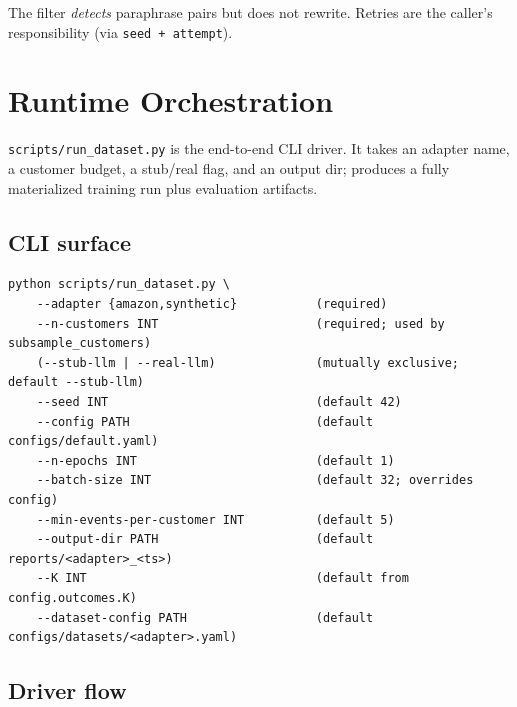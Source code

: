 \documentclass[11pt,a4paper]{article}
\begin{document}
The filter \emph{detects} paraphrase pairs but does not rewrite.
Retries are the caller's responsibility (via \texttt{seed + attempt}).

\section{Runtime Orchestration}
\label{sec:driver}

\texttt{scripts/run\_dataset.py} is the end-to-end CLI driver. It
takes an adapter name, a customer budget, a stub/real flag, and an
output dir; produces a fully materialized training run plus evaluation
artifacts.

\subsection{CLI surface}

\begin{lstlisting}[basicstyle=\ttfamily\footnotesize]
python scripts/run_dataset.py \
    --adapter {amazon,synthetic}           (required)
    --n-customers INT                      (required; used by subsample_customers)
    (--stub-llm | --real-llm)              (mutually exclusive; default --stub-llm)
    --seed INT                             (default 42)
    --config PATH                          (default configs/default.yaml)
    --n-epochs INT                         (default 1)
    --batch-size INT                       (default 32; overrides config)
    --min-events-per-customer INT          (default 5)
    --output-dir PATH                      (default reports/<adapter>_<ts>)
    --K INT                                (default from config.outcomes.K)
    --dataset-config PATH                  (default configs/datasets/<adapter>.yaml)
\end{lstlisting}

\subsection{Driver flow}
\end{document}
